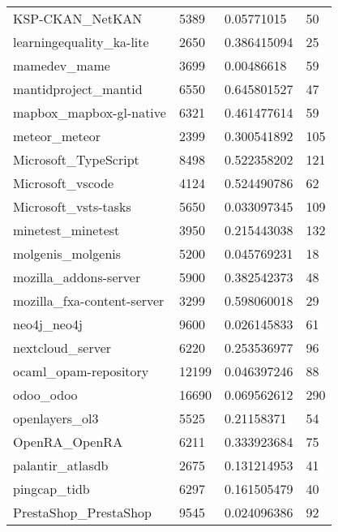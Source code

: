 \begin{center}
\begin{longtable}{l|l|l|l}
KSP-CKAN\_NetKAN                             & 5389     & 0.05771015      & 50  \\
learningequality\_ka-lite                    & 2650     & 0.386415094     & 25  \\
mamedev\_mame                                & 3699     & 0.00486618      & 59  \\
mantidproject\_mantid                        & 6550     & 0.645801527     & 47  \\
mapbox\_mapbox-gl-native                     & 6321     & 0.461477614     & 59  \\
meteor\_meteor                               & 2399     & 0.300541892     & 105 \\
Microsoft\_TypeScript                        & 8498     & 0.522358202     & 121 \\
Microsoft\_vscode                            & 4124     & 0.524490786     & 62  \\
Microsoft\_vsts-tasks                        & 5650     & 0.033097345     & 109 \\
minetest\_minetest                           & 3950     & 0.215443038     & 132 \\
molgenis\_molgenis                           & 5200     & 0.045769231     & 18  \\
mozilla\_addons-server                       & 5900     & 0.382542373     & 48  \\
mozilla\_fxa-content-server                  & 3299     & 0.598060018     & 29  \\
neo4j\_neo4j                                 & 9600     & 0.026145833     & 61  \\
nextcloud\_server                            & 6220     & 0.253536977     & 96  \\
ocaml\_opam-repository                       & 12199    & 0.046397246     & 88  \\
odoo\_odoo                                   & 16690    & 0.069562612     & 290 \\
openlayers\_ol3                              & 5525     & 0.21158371      & 54  \\
OpenRA\_OpenRA                               & 6211     & 0.333923684     & 75  \\
palantir\_atlasdb                            & 2675     & 0.131214953     & 41  \\
pingcap\_tidb                                & 6297     & 0.161505479     & 40  \\
PrestaShop\_PrestaShop                       & 9545     & 0.024096386     & 92  \\

\end{longtable}
\end{center}
